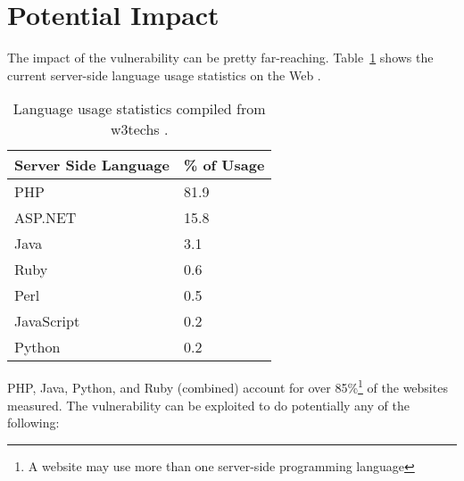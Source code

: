 \section{Potential Impact}

The impact of the vulnerability can be pretty far-reaching.
Table~\ref{tab:usage} shows the current server-side language usage statistics on the Web \cite{W3techs}. 

\begin{table}[!tb]
	\centering
	\begin{tabular}{|p{4cm}|p{4cm}|}
		\hline
		\multicolumn{1}{|c|}{\textbf{Server Side Language}} & \multicolumn{1}{c|}{\textbf{\% of Usage}}\\
		\hline
		PHP & 81.9\\
		\hline    
		ASP.NET & 15.8\\
		\hline
		Java & 3.1\\
		\hline
		Ruby & 0.6\\
		\hline
		Perl & 0.5\\
		\hline
		JavaScript & 0.2\\
		\hline
		Python & 0.2\\
		\hline
		
	\end{tabular}
	\caption[]{Language usage statistics compiled from w3techs \cite{W3techs}.}
	\label{tab:usage}
\end{table}

PHP, Java, Python, and Ruby (combined) account for over 85\%\footnote{A website may use more than one server-side programming language} of the websites measured. The vulnerability can be exploited to do potentially any of the following:


